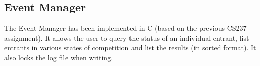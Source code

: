 \documentclass[a4paper, twoside]{article}
\begin{document}
\subsection{Event Manager}
The Event Manager has been implemented in C (based on the previous CS237
assignment). It allows the user to query the status of an individual entrant,
list entrants in various states of competition and list the results (in sorted
format). It also locks the log file when writing.
\end{document}
